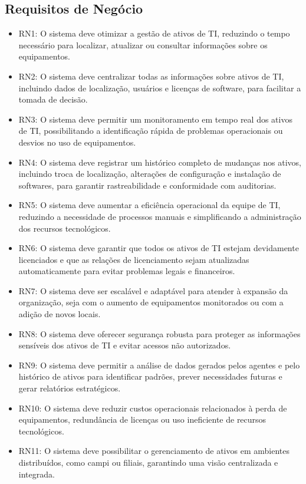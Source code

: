 \subsection{Requisitos de Negócio}
\begin{itemize}
    \item RN1: O sistema deve otimizar a gestão de ativos de TI, reduzindo o tempo necessário para localizar, atualizar ou consultar informações sobre os equipamentos.
    \item RN2: O sistema deve centralizar todas as informações sobre ativos de TI, incluindo dados de localização, usuários e licenças de software, para facilitar a tomada de decisão.
    \item RN3: O sistema deve permitir um monitoramento em tempo real dos ativos de TI, possibilitando a identificação rápida de problemas operacionais ou desvios no uso de equipamentos.
    \item RN4: O sistema deve registrar um histórico completo de mudanças nos ativos, incluindo troca de localização, alterações de configuração e instalação de softwares, para garantir rastreabilidade e conformidade com auditorias.
    \item RN5: O sistema deve aumentar a eficiência operacional da equipe de TI, reduzindo a necessidade de processos manuais e simplificando a administração dos recursos tecnológicos.
    \item RN6: O sistema deve garantir que todos os ativos de TI estejam devidamente licenciados e que as relações de licenciamento sejam atualizadas automaticamente para evitar problemas legais e financeiros.
    \item RN7: O sistema deve ser escalável e adaptável para atender à expansão da organização, seja com o aumento de equipamentos monitorados ou com a adição de novos locais.
    \item RN8: O sistema deve oferecer segurança robusta para proteger as informações sensíveis dos ativos de TI e evitar acessos não autorizados.
    \item RN9: O sistema deve permitir a análise de dados gerados pelos agentes e pelo histórico de ativos para identificar padrões, prever necessidades futuras e gerar relatórios estratégicos.
    \item RN10: O sistema deve reduzir custos operacionais relacionados à perda de equipamentos, redundância de licenças ou uso ineficiente de recursos tecnológicos. 
    \item RN11: O sistema deve possibilitar o gerenciamento de ativos em ambientes distribuídos, como campi ou filiais, garantindo uma visão centralizada e integrada.
\end{itemize}

